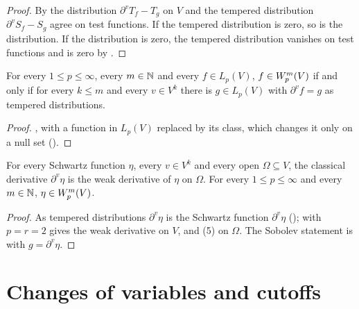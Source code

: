 \begin{proof}
\leanok
By  the distribution $\partial^v T_f - T_g$ on $V$ and the
tempered distribution $\partial^v S_f - S_g$ agree on test functions. If the tempered distribution
is zero, so is the distribution. If the distribution is zero, the tempered distribution vanishes
on test functions and is zero by .
\end{proof}

\begin{corollary}
\label{cor:sobolev-tempered}
\leanok
{}
For every $1 \leq p \leq \infty$, every $m \in \mathbb{N}$ and every $f \in L_p(V)$, $f \in W^{m}_{p}(V)$
if and only if for every $k \leq m$ and every $v \in V^k$ there is $g \in L_p(V)$ with
$\partial^v f = g$ as tempered distributions.
\end{corollary}

\begin{proof}
\leanok
{}, with a function in $L_p(V)$ replaced by its class, which
changes it only on a null set ().
\end{proof}

\begin{corollary}
\label{cor:weak-derivative-schwartz}
\leanok
{}
For every Schwartz function $\eta$, every $v \in V^k$ and every open $\Omega \subseteq V$, the
classical derivative $\partial^v \eta$ is the weak derivative of $\eta$ on $\Omega$. For every
$1 \leq p \leq \infty$ and every $m \in \mathbb{N}$, $\eta \in W^{m}_{p}(V)$.
\end{corollary}

\begin{proof}
\leanok
As tempered distributions $\partial^v \eta$ is the Schwartz function $\partial^v \eta$
();  with $p = r = 2$ gives
the weak derivative on $V$, and  (5) on $\Omega$. The Sobolev
statement is  with $g = \partial^v \eta$.
\end{proof}

\section{Changes of variables and cutoffs}
\label{sec:weak-derivative-change-of-variables}

